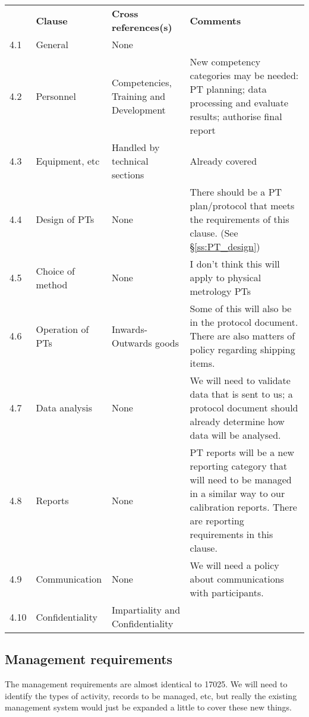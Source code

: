 \begin{center}
{\renewcommand*{\arraystretch}{1.4}
\begin{tabular}{p{1em}p{10em}p{12em}p{16em}}
	\rowcolor[rgb]{ 0,  0,  0} 
	\textcolor[rgb]{ 1,  1,  1}{} & 
	\textcolor[rgb]{ 1,  1,  1}{\textbf{Clause}} & 
	\textcolor[rgb]{ 1,  1,  1}{\textbf{Cross references(s)}} &
	\textcolor[rgb]{ 1,  1,  1}{\textbf{Comments}} \\
4.1 & General & None &   \\
4.2	& Personnel &
Competencies, Training and Development \cite[\S\ref*{QM-s:competencies_professional_development}]{MSL_Quality_Manual} & 
New competency categories may be needed: PT planning; data processing and evaluate results; authorise final report \\
4.3	& Equipment, etc & Handled by technical sections	& Already covered \\
4.4	& Design of PTs	& None	& There should be a PT plan/protocol that meets the requirements of this clause. (See \S\ref{ss:PT_design}) \\
4.5	& Choice of method	& None	& I don't think this will apply to physical metrology PTs \\
4.6	& Operation of PTs	& Inwards-Outwards goods \cite[\S\ref*{QM-s:inwards_outwards_goods}]{MSL_Quality_Manual} & 
Some of this will also be in the protocol document. There are also matters of policy regarding shipping items. \\
4.7	& Data analysis	& None	& We will need to validate data that is sent to us; a protocol document should already determine how data will be analysed.\\
4.8	& Reports	& None	& PT reports will be a new reporting category that will need to be managed in a similar way to our calibration reports. There are reporting requirements in this clause.\\
4.9	& Communication	& None	& We will need a policy about communications with participants.\\
4.10	& Confidentiality	& Impartiality \cite[\S\ref*{QM-sssp:impartiality}]{MSL_Quality_Manual} and Confidentiality \cite[\S\ref*{QM-sss:confidentiality}]{MSL_Quality_Manual} 

\end{tabular} } \end{center}

\subsection{Management requirements}
The management requirements are almost identical to 17025. We will need to identify the types of activity, records to be managed, etc, but really the existing management system would just be expanded a little to cover these new things.

